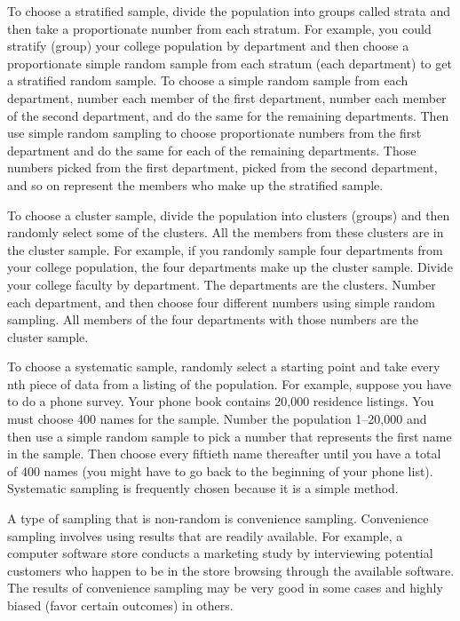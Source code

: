 \documentclass[
  letterpaper,
  DIV=11,
  numbers=noendperiod]{scrreprt}
\begin{document}
To choose a stratified sample, divide the population into groups called
strata and then take a proportionate number from each stratum. For
example, you could stratify (group) your college population by
department and then choose a proportionate simple random sample from
each stratum (each department) to get a stratified random sample. To
choose a simple random sample from each department, number each member
of the first department, number each member of the second department,
and do the same for the remaining departments. Then use simple random
sampling to choose proportionate numbers from the first department and
do the same for each of the remaining departments. Those numbers picked
from the first department, picked from the second department, and so on
represent the members who make up the stratified sample.

To choose a cluster sample, divide the population into clusters (groups)
and then randomly select some of the clusters. All the members from
these clusters are in the cluster sample. For example, if you randomly
sample four departments from your college population, the four
departments make up the cluster sample. Divide your college faculty by
department. The departments are the clusters. Number each department,
and then choose four different numbers using simple random sampling. All
members of the four departments with those numbers are the cluster
sample.

To choose a systematic sample, randomly select a starting point and take
every nth piece of data from a listing of the population. For example,
suppose you have to do a phone survey. Your phone book contains 20,000
residence listings. You must choose 400 names for the sample. Number the
population 1--20,000 and then use a simple random sample to pick a
number that represents the first name in the sample. Then choose every
fiftieth name thereafter until you have a total of 400 names (you might
have to go back to the beginning of your phone list). Systematic
sampling is frequently chosen because it is a simple method.

A type of sampling that is non-random is convenience sampling.
Convenience sampling involves using results that are readily available.
For example, a computer software store conducts a marketing study by
interviewing potential customers who happen to be in the store browsing
through the available software. The results of convenience sampling may
be very good in some cases and highly biased (favor certain outcomes) in
others.
\end{document}
